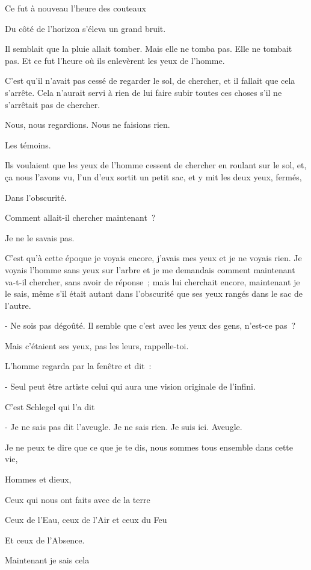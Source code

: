 Ce fut à nouveau l'heure des couteaux

Du côté de l'horizon s'éleva un grand bruit.

Il semblait que la pluie allait tomber. Mais elle ne tomba pas. Elle ne
tombait pas. Et ce fut l'heure où ils enlevèrent les yeux de l'homme.

C'est qu'il n'avait pas cessé de regarder le sol, de chercher, et il
fallait que cela s'arrête. Cela n'aurait servi à rien de lui faire subir
toutes ces choses s'il ne s'arrêtait pas de chercher.

Nous, nous regardions. Nous ne faisions rien.

Les témoins.

Ils voulaient que les yeux de l'homme cessent de chercher en roulant sur
le sol, et, ça nous l'avons vu, l'un d'eux sortit un petit sac, et y mit
les deux yeux, fermés,

Dans l'obscurité.

Comment allait-il chercher maintenant~?

Je ne le savais pas.

C'est qu'à cette époque je voyais encore, j'avais mes yeux et je ne
voyais rien. Je voyais l'homme sans yeux sur l'arbre et je me demandais
comment maintenant va-t-il chercher, sans avoir de réponse~; mais lui
cherchait encore, maintenant je le sais, même s'il était autant dans
l'obscurité que ses yeux rangés dans le sac de l'autre.

- Ne sois pas dégoûté. Il semble que c'est avec les yeux des gens,
n'est-ce pas~?

Mais c'étaient ses yeux, pas les leurs, rappelle-toi.

L'homme regarda par la fenêtre et dit~:

- Seul peut être artiste celui qui aura une vision originale de
l'infini.

C'est Schlegel qui l'a dit

- Je ne sais pas dit l'aveugle. Je ne sais rien. Je suis ici. Aveugle.

Je ne peux te dire que ce que je te dis, nous sommes tous ensemble dans
cette vie,

Hommes et dieux,

Ceux qui nous ont faits avec de la terre

Ceux de l'Eau, ceux de l'Air et ceux du Feu

Et ceux de l'Absence.

Maintenant je sais cela\\	

